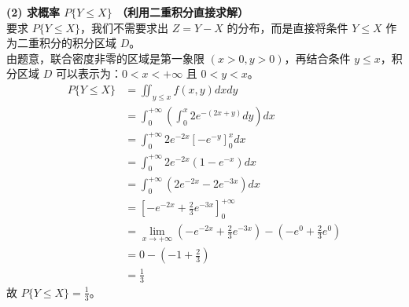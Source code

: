 \textbf{(2) 求概率 $P\{Y \le X\}$ （利用二重积分直接求解）}\\
要求 $P\{Y \le X\}$，我们不需要求出 $Z=Y-X$ 的分布，而是直接将条件 $Y \le X$ 作为二重积分的积分区域 $D$。\\
由题意，联合密度非零的区域是第一象限 $(x>0, y>0)$，再结合条件 $y \le x$，积分区域 $D$ 可以表示为：$0 < x < +\infty$ 且 $0 < y < x$。
$$ 
\begin{aligned}
P\{Y \le X\} &= \iint_{y \le x} f(x,y) dx dy \\
&= \int_{0}^{+\infty} \left( \int_{0}^{x} 2e^{-(2x+y)} dy \right) dx \\
&= \int_{0}^{+\infty} 2e^{-2x} \left[ -e^{-y} \right]_{0}^{x} dx \\
&= \int_{0}^{+\infty} 2e^{-2x} (1 - e^{-x}) dx \\
&= \int_{0}^{+\infty} (2e^{-2x} - 2e^{-3x}) dx \\
&= \left[ -e^{-2x} + \frac{2}{3}e^{-3x} \right]_{0}^{+\infty} \\
&= \lim_{x \to +\infty} \left( -e^{-2x} + \frac{2}{3}e^{-3x} \right) - \left( -e^{0} + \frac{2}{3}e^{0} \right) \\
&= 0 - \left( -1 + \frac{2}{3} \right) \\
&= \frac{1}{3}
\end{aligned}
$$
故 $P\{Y \le X\} = \frac{1}{3}$。